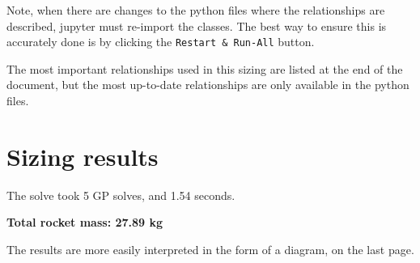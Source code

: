 \documentclass[12pt]{article}
\begin{document}
Note, when there are changes to the python files where the relationships are described, jupyter must re-import the classes. The best way to ensure this is accurately done is by clicking the \texttt{Restart \& Run-All} button. 

The most important relationships used in this sizing are listed at the end of the document, but the most up-to-date relationships are only available in the python files. 


\section{Sizing results}

The solve  took 5 GP solves, and 1.54 seconds. 

\textbf{Total rocket mass: 27.89 kg}

The results are more easily interpreted in the form of a diagram, on the last page.
\end{document}
